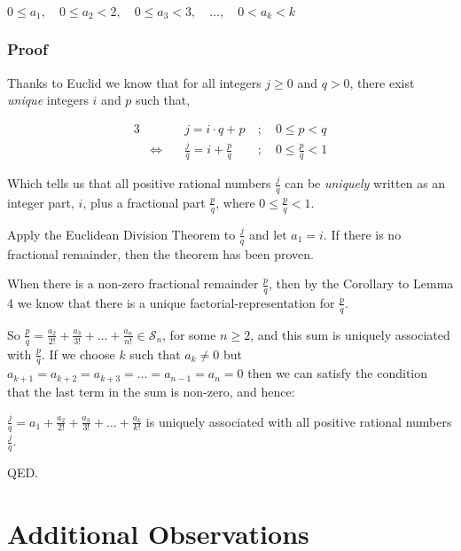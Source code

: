 \documentclass{article}
\begin{document}
{\small
\begin{center}
\(0\le{}a_1,\quad 0\le{}a_2<2,\quad 0\le{}a_3<3,\quad \dots{},\quad 0<a_k<k\)
\end{center}
}

\subsubsection*{Proof}

Thanks to Euclid we know that for all integers \(j\ge{}0\) and \(q>0\),
there exist \emph{unique} integers \(i\) and \(p\) such that,

{\normalsize
\bgroup                                  %
\setlength{\abovedisplayskip}{0pt}       %
\begin{alignat*}{3}
&&j = i\cdot{}q + p\ &;\quad 0\le{}p<q \\
&\Leftrightarrow\quad &\frac{j}{q} = i + \frac{p}{q}\ &;\quad 0\le{}\frac{p}{q}<1
\end{alignat*}
\egroup
}\par
Which tells us that all positive rational numbers \(\frac{j}{q}\) can be
\emph{uniquely}
written as
an integer part, \(i\), plus a fractional part \(\frac{p}{q}\), where \(0\le{}\frac{p}{q}<1\).

Apply the Euclidean Division Theorem to \(\frac{j}{q}\) and let \(a_1 = i\). If there is no fractional remainder, then
the theorem has been proven.

When there is a non-zero fractional remainder \(\frac{p}{q}\), then 
by the Corollary to Lemma 4 we know that there is a
unique factorial-representation for \(\frac{p}{q}\).

So \(\frac{p}{q} = \frac{a_2}{2!} + \frac{a_3}{3!} + \dots{} + \frac{a_n}{n!} \in \mathcal{S}_n\), for some
\(n \ge{} 2\), and this sum is uniquely associated with \(\frac{p}{q}\).
If we choose \(k\) such that \(a_k \ne{} 0 \) but \(a_{k+1} =
a_{k+2} =
a_{k+3} =
\dots{} =
a_{n-1} =
a_{n} = 0\) then we can satisfy the condition that the last term in the sum is non-zero, and hence:

\(\frac{j}{q} = a_1 + \frac{a_2}{2!} + \frac{a_3}{3!} + \dots{} + \frac{a_k}{k!}\)
is uniquely associated with all positive rational numbers \(\frac{j}{q}\).

QED.

\break
\section*{Additional Observations}
\end{document}
